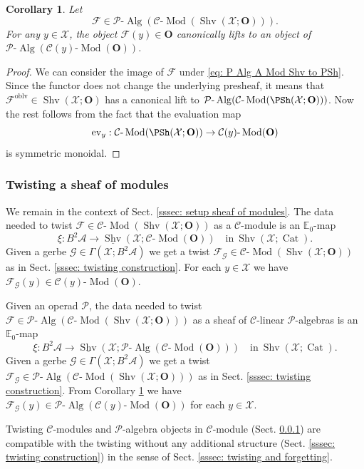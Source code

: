 \documentclass[10pt]{amsart}
\newcommand{\sssec}{\subsubsection}
\newtheorem{cor}[subsubsection]{Corollary}
\theoremstyle{remark}
\newcommand{\te}{\text}
\newcommand{\ul}{\underline}
\newcommand{\E}{\mathbb{E}}
\newcommand{\cP}{\mathcal{P}}
\newcommand{\on}{\operatorname}
\newcommand{\cA}{\mathcal{A}}
\newcommand{\cC}{\mathcal{C}}
\newcommand{\cF}{\mathcal{F}}
\newcommand{\cG}{\mathcal{G}}
\newcommand{\cX}{\mathcal{X}}
\newcommand{\Cat}{\on{Cat}}
\newcommand{\lMod}{\text{-}\on{Mod}}
\newcommand{\lAlg}{\text{-}\on{Alg}}
\newcommand{\Shv}{\on{Shv}}
\newcommand{\bO}{\mathbf{O}}
\begin{document}
\begin{cor}\label{cor: algebra structure on section}
    Let
\[\cF\in\cP\lAlg(\cC\lMod(\Shv(\cX;\bO))).\]
For any $y\in\cX$, the object $\cF(y)\in\bO$ canonically lifts to an object of $\cP\lAlg(\cC(y)\lMod(\bO))$.
\end{cor}
\begin{proof}
    We can consider the image of $\cF$ under \eqref{eq: P Alg A Mod Shv to PSh}. Since the functor does not change the underlying presheaf, it means that $\cF^{\on{oblv}}\in\Shv(\cX;\bO)$ has a canonical lift to $\cP\lAlg(\cC\lMod(\PSh(\cX;\bO)))$. Now the rest follows from the fact that the evaluation map
\[\on{ev}_y: \cC\lMod(\PSh(\cX;\bO))\rightarrow \cC(y)\lMod(\bO)\]
is symmetric monoidal.
\end{proof}

\sssec{Twisting a sheaf of modules}\label{sssec: twisting construction modules}
We remain in the context of Sect. \ref{sssec: setup sheaf of modules}. The data needed to twist $\cF\in\cC\lMod(\Shv(\cX;\bO))$ as a $\cC$-module is an $\E_0$-map
\begin{equation}\label{eq: twisting data modules}
    \xi:B^2\cA\rightarrow \ul{\Shv}(\cX;\cC\lMod(\bO))\quad \te{in} \ \Shv(\cX;\Cat).
\end{equation}
Given a gerbe $\cG\in\Gamma(\cX;B^2\cA)$ we get a twist $\cF_{\cG}\in \cC\lMod(\Shv(\cX;\bO))$ as in Sect. \ref{sssec: twisting construction}. For each $y\in \cX$ we have $\cF_{\cG}(y)\in\cC(y)\lMod(\bO)$.
\medskip

Given an operad $\cP$, the data needed to twist $\cF\in \cP\lAlg(\cC\lMod(\Shv(\cX;\bO)))$ as a sheaf of $\cC$-linear $\cP$-algebras is an $\E_0$-map
\begin{equation}\label{eq: twisting data algebras in modules}
    \xi: B^2\cA\rightarrow \ul{\Shv}(\cX;\cP\lAlg(\cC\lMod(\bO)))\quad \te{in} \ \Shv(\cX;\Cat).
\end{equation}
Given a gerbe $\cG\in\Gamma(\cX;B^2\cA)$ we get a twist $\cF_{\cG}\in \cP\lAlg(\cC\lMod(\Shv(\cX;\bO)))$ as in Sect. \ref{sssec: twisting construction}. From Corollary \ref{cor: algebra structure on section} we have
$\cF_{\cG}(y)\in\cP\lAlg(\cC(y)\lMod(\bO))$ for each $y\in\cX$.
\medskip

Twisting $\cC$-modules and $\cP$-algebra objects in $\cC$-module (Sect. \ref{sssec: twisting construction modules}) are compatible with the twisting without any additional structure (Sect. \ref{sssec: twisting construction}) in the sense of Sect. \ref{sssec: twisting and forgetting}.
\end{document}
